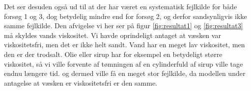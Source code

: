\documentclass[a4paper, 11pt]{article}
\begin{document}
Det ser desuden også ud til at der har været en systematisk fejlkilde for både forsøg 1 og 3, dog betydelig mindre end for forsøg 2, og derfor sandsynligvis ikke samme fejlkilde.
Den afvigelse vi her ser på figur \ref*{fig:resultat1} og \ref*{fig:resultat3} må skyldes vands viskositet. Vi havde oprindeligt antaget at væsken var viskositetsfri, men det er ikke helt sandt. Vand har en meget lav viskositet, men den er der trodsalt.
Olie eller sirup har for eksempel en betydeligt større viskositet, så vi ville forvente af tømningen af en cylinderfuld af sirup ville tage endnu længere tid. og dermed ville få en meget stor fejlkilde, da modellen under antagelse at væsken er viskositetsfri er den samme.

\end{document}
